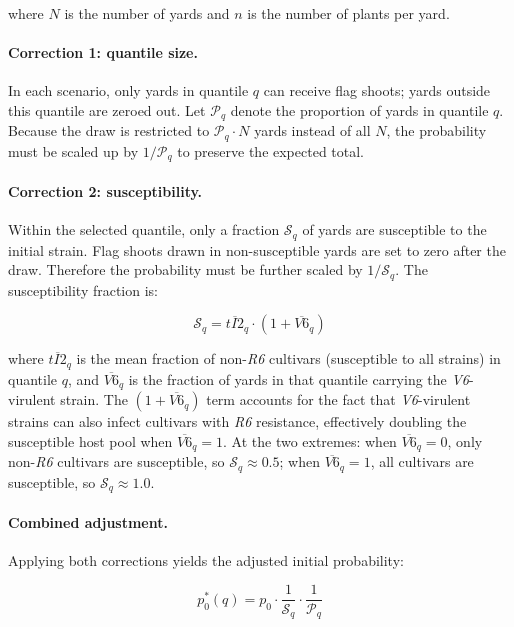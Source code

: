 \documentclass[10pt,a4paper]{article}
\begin{document}
\noindent where $N$ is the number of yards and $n$ is the number of plants per yard.

\paragraph{Correction 1: quantile size.} In each scenario, only yards in quantile $q$ can receive flag shoots; yards outside this quantile are zeroed out. Let $\mathcal{P}_q$ denote the proportion of yards in quantile $q$. Because the draw is restricted to $\mathcal{P}_q \cdot N$ yards instead of all $N$, the probability must be scaled up by $1/\mathcal{P}_q$ to preserve the expected total.

\paragraph{Correction 2: susceptibility.} Within the selected quantile, only a fraction $\mathcal{S}_q$ of yards are susceptible to the initial strain. Flag shoots drawn in non-susceptible yards are set to zero after the draw. Therefore the probability must be further scaled by $1/\mathcal{S}_q$. The susceptibility fraction is:

\begin{equation}
\mathcal{S}_q = \overline{tI2}_q \cdot (1 + \overline{V6}_q)
\label{eq:susceptibility}
\end{equation}

\noindent where $\overline{tI2}_q$ is the mean fraction of non-\textit{R6} cultivars (susceptible to all strains) in quantile $q$, and $\overline{V6}_q$ is the fraction of yards in that quantile carrying the \textit{V6}-virulent strain. The $(1 + \overline{V6}_q)$ term accounts for the fact that \textit{V6}-virulent strains can also infect cultivars with \textit{R6} resistance, effectively doubling the susceptible host pool when $\overline{V6}_q = 1$. At the two extremes: when $\overline{V6}_q = 0$, only non-\textit{R6} cultivars are susceptible, so $\mathcal{S}_q \approx 0.5$; when $\overline{V6}_q = 1$, all cultivars are susceptible, so $\mathcal{S}_q \approx 1.0$.

\paragraph{Combined adjustment.} Applying both corrections yields the adjusted initial probability:

\begin{equation}
p_0^{\ast}(q) = p_0 \cdot \frac{1}{\mathcal{S}_q} \cdot \frac{1}{\mathcal{P}_q}
\label{eq:adjusted_p0}
\end{equation}
\end{document}
